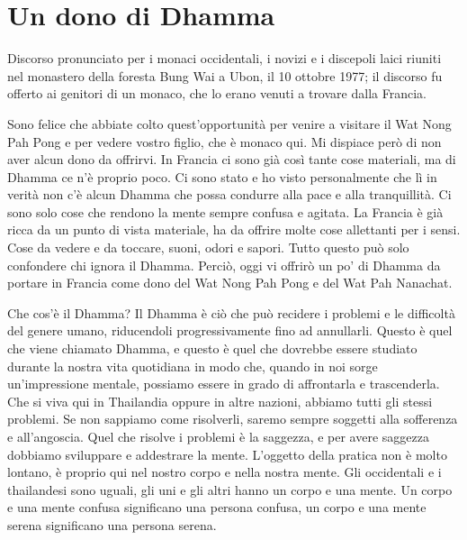\chapter{Un dono di Dhamma}

\begin{openingQuote}
  \centering

  Discorso pronunciato per i monaci occidentali, i novizi e i discepoli laici
  riuniti nel monastero della foresta Bung Wai a Ubon, il 10 ottobre 1977; il
  discorso fu offerto ai genitori di un monaco, che lo erano venuti a trovare
  dalla Francia.
\end{openingQuote}

Sono felice che abbiate colto quest'opportunità per venire a visitare il
Wat Nong Pah Pong e per vedere vostro figlio, che è monaco qui. Mi
dispiace però di non aver alcun dono da offrirvi. In Francia ci sono già
così tante cose materiali, ma di Dhamma ce n'è proprio poco. Ci sono
stato e ho visto personalmente che lì in verità non c'è alcun Dhamma che
possa condurre alla pace e alla tranquillità. Ci sono solo cose che
rendono la mente sempre confusa e agitata. La Francia è già ricca da un
punto di vista materiale, ha da offrire molte cose allettanti per i
sensi. Cose da vedere e da toccare, suoni, odori e sapori. Tutto questo
può solo confondere chi ignora il Dhamma. Perciò, oggi vi offrirò un po'
di Dhamma da portare in Francia come dono del Wat Nong Pah Pong e del
Wat Pah Nanachat.

Che cos'è il Dhamma? Il Dhamma è ciò che può recidere i problemi e le
difficoltà del genere umano, riducendoli progressivamente fino ad
annullarli. Questo è quel che viene chiamato Dhamma, e questo è quel che
dovrebbe essere studiato durante la nostra vita quotidiana in modo che,
quando in noi sorge un'impressione mentale, possiamo essere in grado di
affrontarla e trascenderla. Che si viva qui in Thailandia oppure in
altre nazioni, abbiamo tutti gli stessi problemi. Se non sappiamo come
risolverli, saremo sempre soggetti alla sofferenza e all'angoscia. Quel
che risolve i problemi è la saggezza, e per avere saggezza dobbiamo
sviluppare e addestrare la mente. L'oggetto della pratica non è molto
lontano, è proprio qui nel nostro corpo e nella nostra mente. Gli
occidentali e i thailandesi sono uguali, gli uni e gli altri hanno un
corpo e una mente. Un corpo e una mente confusa significano una persona
confusa, un corpo e una mente serena significano una persona serena.

